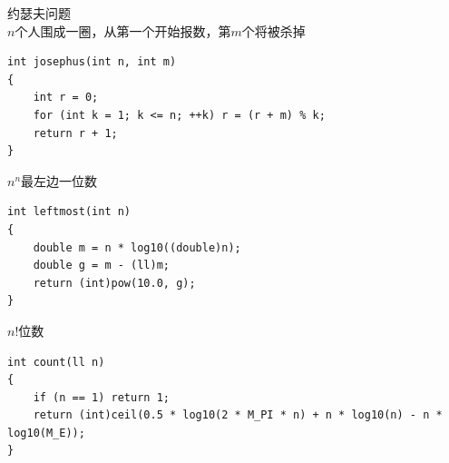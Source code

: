 \documentclass[twoside]{article}
\begin{document}
约瑟夫问题\\
$n$个人围成一圈，从第一个开始报数，第$m$个将被杀掉
\begin{lstlisting}
int josephus(int n, int m)
{
    int r = 0;
    for (int k = 1; k <= n; ++k) r = (r + m) % k;
    return r + 1;
}
\end{lstlisting}
$n^n$最左边一位数
\begin{lstlisting}
int leftmost(int n)
{
    double m = n * log10((double)n);
    double g = m - (ll)m;
    return (int)pow(10.0, g);
}
\end{lstlisting}
$n!$位数
\begin{lstlisting}
int count(ll n)
{
    if (n == 1) return 1;
    return (int)ceil(0.5 * log10(2 * M_PI * n) + n * log10(n) - n * log10(M_E));
}
\end{lstlisting}
\end{document}
